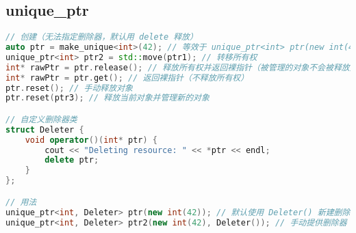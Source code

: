 
\begin{issues}
\issueDraft
\end{issues}

\subsection{unique\_ptr}

\begin{lstlisting}[language=cpp]
// 创建（无法指定删除器，默认用 delete 释放）
auto ptr = make_unique<int>(42); // 等效于 unique_ptr<int> ptr(new int(42));
unique_ptr<int> ptr2 = std::move(ptr1); // 转移所有权
int* rawPtr = ptr.release(); // 释放所有权并返回裸指针（被管理的对象不会被释放）
int* rawPtr = ptr.get(); // 返回裸指针（不释放所有权）
ptr.reset(); // 手动释放对象
ptr.reset(ptr3); // 释放当前对象并管理新的对象

// 自定义删除器类
struct Deleter {
    void operator()(int* ptr) {
        cout << "Deleting resource: " << *ptr << endl;
        delete ptr;
    }
};

// 用法
unique_ptr<int, Deleter> ptr(new int(42)); // 默认使用 Deleter() 新建删除器
unique_ptr<int, Deleter> ptr2(new int(42), Deleter()); // 手动提供删除器
\end{lstlisting}

